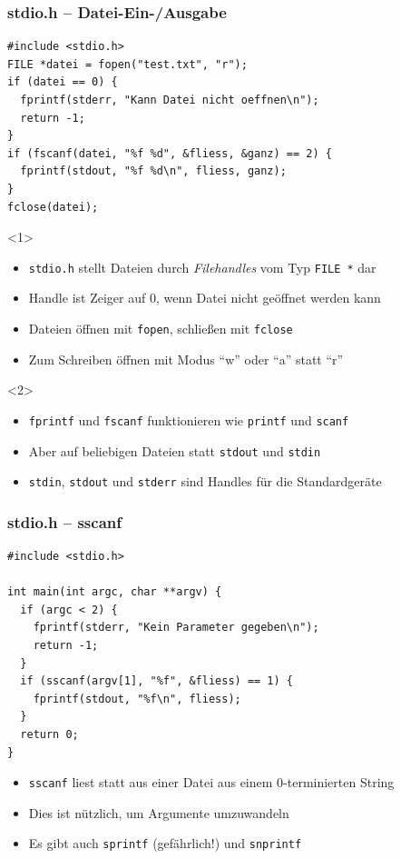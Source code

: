 \documentclass{slides}
\begin{document}
\begin{frame}[fragile]
  \frametitle{stdio.h -- Datei-Ein-/Ausgabe}

\begin{lstlisting}[emph={fclose,fopen,fprintf,fscanf}]
#include <stdio.h>
FILE *datei = fopen("test.txt", "r");
if (datei == 0) {
  fprintf(stderr, "Kann Datei nicht oeffnen\n");
  return -1;
}
if (fscanf(datei, "%f %d", &fliess, &ganz) == 2) {
  fprintf(stdout, "%f %d\n", fliess, ganz);
}
fclose(datei);
\end{lstlisting}

  \begin{onlyenv}<1>
    \begin{itemize}
    \item \lstinline!stdio.h! stellt Dateien durch \emph{Filehandles} vom Typ \lstinline!FILE *! dar
    \item Handle ist Zeiger auf 0, wenn Datei nicht geöffnet werden kann
    \item Dateien öffnen mit \lstinline!fopen!, schließen mit \lstinline!fclose!
    \item Zum Schreiben öffnen mit Modus "`w"' oder "`a"' statt "`r"'
    \end{itemize}
  \end{onlyenv}

  \begin{onlyenv}<2>
    \begin{itemize}
    \item \lstinline!fprintf! und \lstinline!fscanf! funktionieren wie \lstinline!printf! und
      \lstinline!scanf!
    \item Aber auf beliebigen Dateien statt \lstinline!stdout! und \lstinline!stdin!
    \item \lstinline!stdin!, \lstinline!stdout! und \lstinline!stderr! sind Handles für die Standardgeräte
    \end{itemize}
  \end{onlyenv}
\end{frame}

\begin{frame}[fragile]
  \frametitle{stdio.h -- sscanf}

\begin{lstlisting}[emph={sscanf}]
#include <stdio.h>

int main(int argc, char **argv) {
  if (argc < 2) {
    fprintf(stderr, "Kein Parameter gegeben\n");
    return -1;
  }
  if (sscanf(argv[1], "%f", &fliess) == 1) {
    fprintf(stdout, "%f\n", fliess);
  }
  return 0;
}
\end{lstlisting}

  \begin{itemize}
  \item \lstinline!sscanf! liest statt aus einer Datei aus einem 0-terminierten String
  \item Dies ist nützlich, um Argumente umzuwandeln
  \item Es gibt auch \lstinline!sprintf! (gefährlich!) und \lstinline!snprintf!
  \end{itemize}
\end{frame}
\end{document}
